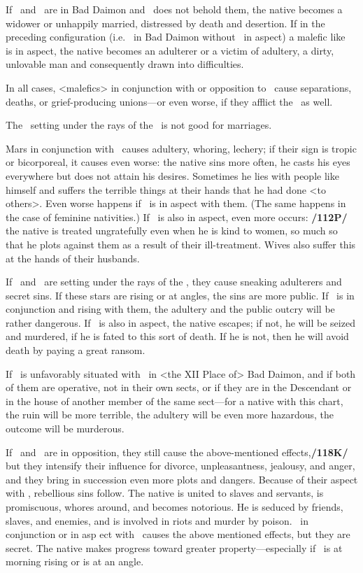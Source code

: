If \Venus\, and \Saturn\, are in Bad Daimon and \Jupiter\, does not behold them, the native becomes a widower or unhappily married, distressed by death and desertion. If in the preceding configuration (i.e. \Venus\, in Bad Daimon without \Jupiter\, in aspect) a malefic like \Mars\, is in aspect, the native becomes an adulterer or a victim of adultery, a dirty, unlovable man and consequently drawn into difficulties. 

In all cases, <malefics> in conjunction with or opposition to \Venus\, cause separations, deaths, or grief-producing unions—or even worse, if they afflict the \Moon\, as well.

The \Moon\, setting under the rays of the \Sun\, is not good for marriages. 

Mars in conjunction with \Mercury\, causes adultery, whoring, lechery; if their sign is tropic or bicorporeal, it causes even worse: the native sins more often, he casts his eyes everywhere but does not attain his desires. Sometimes he lies with people like himself and suffers the terrible things at their hands that he had done <to others>. Even
worse happens if \Mercury\, is in aspect with them. (The same happens in the case of feminine nativities.) If \Saturn\, is also in aspect, even more occurs: \textbf{/112P/} the native is treated ungratefully even when he is kind to women, so much so that he plots against them as a result of their ill-treatment. Wives also suffer this at the hands of their husbands.

If \Mars\, and \Venus\, are setting under the rays of the \Sun, they cause sneaking adulterers and secret sins.
If these stars are rising or at angles, the sins are more public. If \Mercury\, is in conjunction and rising with
them, the adultery and the public outcry will be rather dangerous. If \Jupiter\, is also in aspect, the native
escapes; if not, he will be seized and murdered, if he is fated to this sort of death. If he is not, then he will
avoid death by paying a great ransom. 

If \Venus\, is unfavorably situated with \Mars\, in <the XII Place of> Bad Daimon, and if both of them are operative, not in their own sects, or if they are in the Descendant or in the house of another member of the same sect—for a native with this chart, the ruin will be more terrible, the adultery will be even more hazardous, the outcome will be murderous. 

If \Mars\, and \Venus\, are in opposition, they still cause the above-mentioned effects,\textbf{/118K/} but they intensify their influence for
divorce, unpleasantness, jealousy, and anger, and they bring in succession even more plots and dangers. Because of their aspect with \Mercury, rebellious sins follow. The native is united to slaves and servants, is promiscuous, whores around, and becomes notorious. He is seduced by friends, slaves, and enemies, and is involved in riots and murder by poison. \Jupiter\, in conjunction or in asp ect with \Venus\, causes the above mentioned effects, but they are secret. The native makes progress toward greater property—especially if \Jupiter\, is at morning rising or is at an angle.

